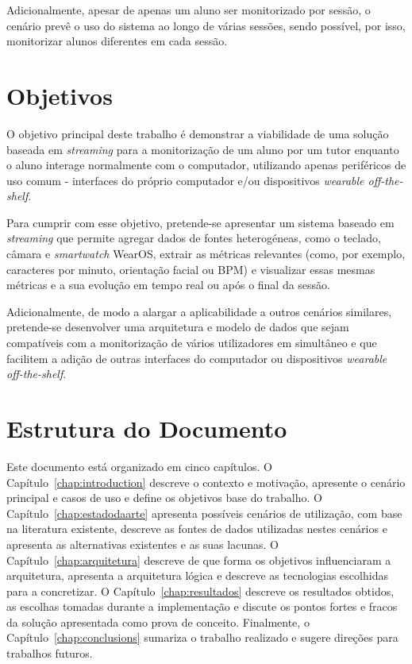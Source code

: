     Adicionalmente, apesar de apenas um aluno ser monitorizado por sessão, o cenário prevê o uso do sistema ao longo de várias sessões, sendo possível, por isso, monitorizar alunos diferentes em cada sessão.

    \section{Objetivos}\label{sec:objectives}

    O objetivo principal deste trabalho é demonstrar a viabilidade de uma solução baseada em \textit{streaming} para a monitorização de um aluno por um tutor enquanto o aluno interage normalmente com o computador, utilizando apenas periféricos de uso comum - interfaces do próprio computador e/ou dispositivos \textit{wearable off-the-shelf}.
    
    Para cumprir com esse objetivo, pretende-se apresentar um sistema baseado em \textit{streaming} que permite agregar dados de fontes heterogéneas, como o teclado, câmara e \textit{smartwatch} WearOS, extrair as métricas relevantes (como, por exemplo, caracteres por minuto, orientação facial ou \ac{BPM}) e visualizar essas mesmas métricas e a sua evolução em tempo real ou após o final da sessão.

    Adicionalmente, de modo a alargar a aplicabilidade a outros cenários similares, pretende-se desenvolver uma arquitetura e modelo de dados que sejam compatíveis com a monitorização de vários utilizadores em simultâneo e que facilitem a adição de outras interfaces do computador ou dispositivos \textit{wearable off-the-shelf}.
    
    \section{Estrutura do Documento}
    Este documento está organizado em cinco capítulos. O Capítulo~\ref{chap:introduction} descreve o contexto e motivação, apresente o cenário principal e casos de uso e define os objetivos base do trabalho.
    O Capítulo~\ref{chap:estadodaarte} apresenta possíveis cenários de utilização, com base na literatura existente, descreve as fontes de dados utilizadas nestes cenários e apresenta as alternativas existentes e as suas lacunas.
    O Capítulo~\ref{chap:arquitetura} descreve de que forma os objetivos influenciaram a arquitetura, apresenta a arquitetura lógica e descreve as tecnologias escolhidas para a concretizar.
    O Capítulo~\ref{chap:resultados} descreve os resultados obtidos, as escolhas tomadas durante a implementação e discute os pontos fortes e fracos da solução apresentada como prova de conceito.
    Finalmente, o Capítulo~\ref{chap:conclusions} sumariza o trabalho realizado e sugere direções para trabalhos futuros.


